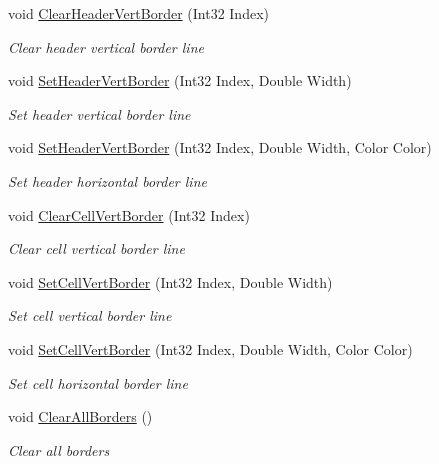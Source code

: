 \begin{DoxyCompactItemize}
void \hyperlink{class_pdf_file_writer_1_1_pdf_table_border_a7f5560c58c590a4669c4e38fd2e04975}{Clear\+Header\+Vert\+Border} (Int32 Index)
\begin{DoxyCompactList}\small\item\em Clear header vertical border line \end{DoxyCompactList}\item 
void \hyperlink{class_pdf_file_writer_1_1_pdf_table_border_a344cf6f5c3681e0143a85ad3101fc6ee}{Set\+Header\+Vert\+Border} (Int32 Index, Double Width)
\begin{DoxyCompactList}\small\item\em Set header vertical border line \end{DoxyCompactList}\item 
void \hyperlink{class_pdf_file_writer_1_1_pdf_table_border_a00e6f4ecb0155a334f90283ff7c79952}{Set\+Header\+Vert\+Border} (Int32 Index, Double Width, Color Color)
\begin{DoxyCompactList}\small\item\em Set header horizontal border line \end{DoxyCompactList}\item 
void \hyperlink{class_pdf_file_writer_1_1_pdf_table_border_a394151691219c80f0806d746d7c203a1}{Clear\+Cell\+Vert\+Border} (Int32 Index)
\begin{DoxyCompactList}\small\item\em Clear cell vertical border line \end{DoxyCompactList}\item 
void \hyperlink{class_pdf_file_writer_1_1_pdf_table_border_a83f47deda97fedd1b78bdd28d798593d}{Set\+Cell\+Vert\+Border} (Int32 Index, Double Width)
\begin{DoxyCompactList}\small\item\em Set cell vertical border line \end{DoxyCompactList}\item 
void \hyperlink{class_pdf_file_writer_1_1_pdf_table_border_a454c8d747f23329622a7d6dc8a168cfd}{Set\+Cell\+Vert\+Border} (Int32 Index, Double Width, Color Color)
\begin{DoxyCompactList}\small\item\em Set cell horizontal border line \end{DoxyCompactList}\item 
void \hyperlink{class_pdf_file_writer_1_1_pdf_table_border_a3e85b7626798cea995b1e7875bfe861d}{Clear\+All\+Borders} ()
\begin{DoxyCompactList}\small\item\em Clear all borders \end{DoxyCompactList}\item 

\end{DoxyCompactItemize}
